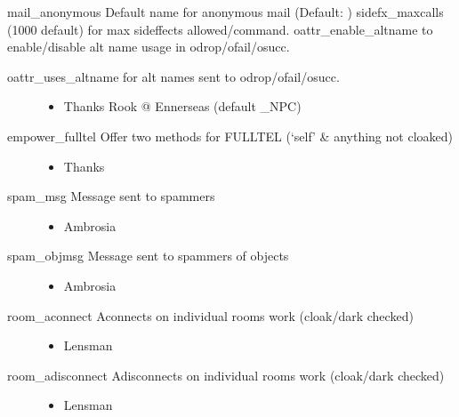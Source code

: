 \documentclass[letterpaper,10pt,english]{sphinxmanual}
\begin{document}
\sphinxAtStartPar
mail\_anonymous \sphinxhyphen{} Default name for anonymous mail (Default: )
sidefx\_maxcalls \sphinxhyphen{} (1000 default) for max sideffects allowed/command.
oattr\_enable\_altname \sphinxhyphen{} to enable/disable alt name usage in odrop/ofail/osucc.
\begin{description}
\item[{oattr\_uses\_altname \sphinxhyphen{} for alt names sent to odrop/ofail/osucc.}] \leavevmode\begin{itemize}
\item {} 
\sphinxAtStartPar
Thanks Rook @ Ennerseas (default \_NPC)

\end{itemize}

\item[{empower\_fulltel \sphinxhyphen{} Offer two methods for FULLTEL (‘self’ \& anything not cloaked)}] \leavevmode\begin{itemize}
\item {} 
\sphinxAtStartPar
Thanks 

\end{itemize}

\item[{spam\_msg \sphinxhyphen{} Message sent to spammers}] \leavevmode\begin{itemize}
\item {} 
\sphinxAtStartPar
Ambrosia

\end{itemize}

\item[{spam\_objmsg \sphinxhyphen{} Message sent to spammers of objects}] \leavevmode\begin{itemize}
\item {} 
\sphinxAtStartPar
Ambrosia

\end{itemize}

\item[{room\_aconnect \sphinxhyphen{} Aconnects on individual rooms work (cloak/dark checked)}] \leavevmode\begin{itemize}
\item {} 
\sphinxAtStartPar
Lensman

\end{itemize}

\item[{room\_adisconnect \sphinxhyphen{} Adisconnects on individual rooms work (cloak/dark checked)}] \leavevmode\begin{itemize}
\item {} 
\sphinxAtStartPar
Lensman

\end{itemize}

\end{description}
\end{document}
